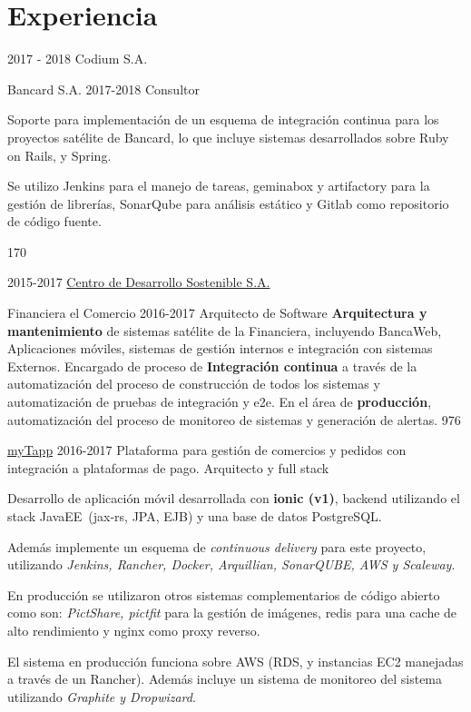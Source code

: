 \documentclass[]{friggeri-cv}
\begin{document}
\section{Experiencia}
\begin{entrylist}
\entry
    {2017 - 2018}
    {Codium S.A.}
    {}
    { \proyecto
        {Bancard S.A.}
        {2017-2018}
        {}
        {Consultor}
        {Soporte para implementación de un esquema de integración continua para los proyectos satélite
    de Bancard, lo que incluye sistemas desarrollados sobre Ruby on Rails, y Spring.
    
    Se utilizo Jenkins para el manejo de tareas, geminabox y artifactory para la gestión de librerías,
    SonarQube para análisis estático y Gitlab como repositorio de código fuente.} 
        {170}
    }
    {}
\entry
    {2015-2017}
    {\href{http://www.cds.com.py}{Centro de Desarrollo Sostenible S.A.}}
    {}
    {\proyecto
        {Financiera el Comercio}
        {2016-2017}
        {}
        {Arquitecto de Software}
        {\textbf{Arquitectura y mantenimiento} de sistemas satélite de la Financiera, incluyendo BancaWeb, Aplicaciones móviles, sistemas de gestión internos e integración con sistemas Externos. Encargado de proceso de 
        \textbf{Integración continua} a través de la automatización del proceso de construcción de todos los sistemas y automatización de pruebas de integración y e2e. En el área de \textbf{producción}, automatización del proceso de monitoreo de sistemas y generación de alertas.
        } 
        {976}
    
    \proyecto
        {\href{https://www.mytappweb.com}{myTapp}}
        {2016-2017}
        {Plataforma para gestión de comercios y pedidos con integración a plataformas de pago.}
        {Arquitecto y full stack}
        {
        Desarrollo de aplicación móvil desarrollada con  \textbf{ionic (v1)}, 
        backend utilizando el stack JavaEE~(jax-rs, JPA, EJB) y una base de datos
        PostgreSQL.
        
		Además implemente un esquema de \textit{continuous delivery} para este proyecto,
        utilizando \textit{Jenkins, Rancher, Docker, Arquillian, SonarQUBE, AWS y Scaleway}. 
        
        En producción se utilizaron  otros sistemas complementarios de código abierto 
        como son: \textit{PictShare, pictfit} para la gestión de imágenes, redis para una
        cache de alto rendimiento y nginx como proxy reverso.
        
        El sistema en producción funciona sobre AWS (RDS, y instancias EC2 manejadas a 
        través de un Rancher). Además incluye un sistema de monitoreo del sistema
        utilizando \textit{Graphite y Dropwizard}.
        } 
        {}
        
}
\end{entrylist}
\end{document}
